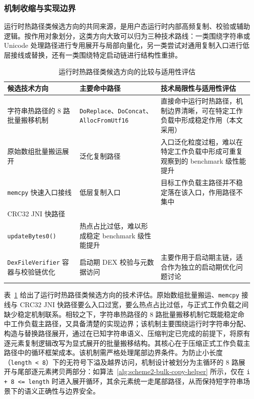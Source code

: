 \subsubsection{机制收缩与实现边界}

运行时热路径类候选方向的共同来源，是用户态运行时内部高频复制、校验或辅助逻辑。按作用对象划分，这类方向大致可以归为三种技术路线：一类围绕字符串或 Unicode 处理路径进行专用展开与局部向量化，另一类尝试对通用复制入口进行低层接线或替换，还有一类围绕特定启动链进行结构性重排\citep{Haubl2008OptimizedStrings,Haubl2010CompactStrings,Cameron2008SIMDUTF,Lemire2022UnicodeSIMD}。

\begin{table}[htbp]
    \centering
    \small
    \caption{运行时热路径类候选方向的比较与适用性评估}
    \label{tab:runtime-candidates}
    \begin{tabular}{>{\raggedright\arraybackslash}p{3.5cm}>{\raggedright\arraybackslash}p{3.2cm}>{\raggedright\arraybackslash}p{4.8cm}}
        \hline
        \textbf{候选技术方向} & \textbf{主要命中路径} & \textbf{技术局限性与适用性评估} \\
        \hline
        字符串热路径的 8 路批量搬移机制 & \texttt{DoReplace}、\texttt{DoConcat}、\texttt{AllocFromUtf16} & 直接命中运行时热路径，机制边界清晰，可在特定工作负载中形成稳定作用（本文采用） \\
        原始数组批量搬运展开 & 泛化复制路径 & 入口泛化粒度过粗，难以在特定工作负载中形成可重复观察到的 benchmark 级性能提升 \\
        \texttt{memcpy} 快速入口接线 & 低层复制入口 & 目标工作负载主路径并不稳定落在该入口，作用路径不集中 \\
        CRC32 JNI 快路径 & \shortstack[l]{\texttt{CRC32.}\\\texttt{updateBytes0()}} & 热点占比过低，难以形成稳定 benchmark 级性能提升 \\
        \texttt{DexFileVerifier} 容器与校验链优化 & 启动期 DEX 校验与元数据访问 & 主要作用于启动期主链，适合作为独立的启动期优化问题讨论 \\
        \hline
    \end{tabular}
\end{table}

表~\ref{tab:runtime-candidates} 给出了运行时热路径类候选方向的技术评估。原始数组批量搬运、\texttt{memcpy} 接线与 CRC32 JNI 快路径要么入口过宽，要么热点占比过低，与正式工作负载之间缺少稳定机制联系。相较之下，字符串热路径的 8 路批量搬移机制它既能稳定命中工作负载主路径，又具备清楚的实现边界；该机制主要围绕运行时字符串分配、构造与替换路径展开，通过在已知字符串语义、压缩判定已完成的前提下，将原有逐元素复制逻辑改写为显式展开的批量搬移结构。其核心在于压缩正式工作负载主路径中的循环框架成本。该机制需严格处理尾部边界条件。为防止小长度（\texttt{length < 8}）下的无符号下溢及越界访问，机制设计被划分为主循环的 8 路展开与尾部逐元素拷贝两部分：如算法~\ref{alg:scheme2-bulk-copy-helper} 所示，仅在 \texttt{i + 8 <= length} 时进入展开循环，其余元素统一走尾部路径，从而保持短字符串场景下的语义正确性与边界安全。


